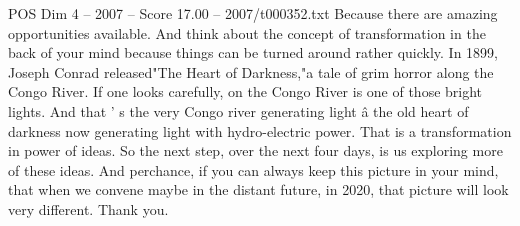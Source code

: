 \begin{textsample}{POS Dim 4 – 2007 – Score 17.00 – 2007/t000352.txt}
Because there are amazing opportunities available.
And think about the concept of transformation in the back of your mind because things can be turned around rather quickly.
In 1899, Joseph Conrad released"The Heart of Darkness,"a tale of grim horror along the Congo River.
If one looks carefully, on the Congo River is one of those bright lights.
And that ' s the very Congo river generating light â the old heart of darkness now generating light with hydro-electric power.
That is a transformation in power of ideas.
So the next step, over the next four days, is us exploring more of these ideas.
And perchance, if you can always keep this picture in your mind, that when we convene maybe in the distant future, in 2020, that picture will look very different.
Thank you.

\end{textsample}
